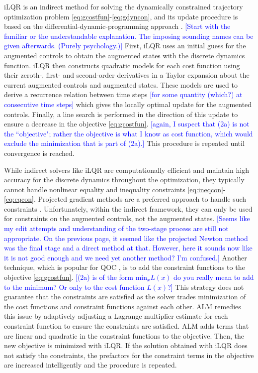 iLQR is an indirect method
for solving the dynamically constrained
trajectory optimization problem \eqref{eq:gcostfun}-\eqref{eq:gdyncon},
and its update procedure is based on the differential-dynamic-programming approach
\cite{mayne1966a}. \textcolor{blue}{[Start with the familiar or the understandable explanation. The imposing sounding names can be given afterwards. (Purely psychology.)]}
First, iLQR uses an initial guess for the augmented controls to obtain the augmented
states with the discrete dynamics function.
iLQR then constructs quadratic models for each cost function using
their zeroth-, first- and second-order derivatives in a Taylor expansion
about the current augmented controls and augmented states.
These models are used to derive a recurrence relation between time steps \textcolor{blue}{[for some quantity (which?) at consecutive time steps]}
which gives the locally optimal update for the augmented controls.
Finally, a line search \cite{zhang2006global}
is performed in the direction of this update to ensure a
decrease in the objective \eqref{eq:gcostfun}. \textcolor{blue}{[again, I suspect that (2a) is not the ``objective"; rather the objective is what I know as cost function, which would exclude the minimization that is part of (2a).]} This procedure
is repeated until convergence is reached.

While indirect solvers like iLQR are computationally efficient and maintain high accuracy for the discrete dynamics throughout the optimization, they typically cannot handle
nonlinear equality and inequality
constraints \eqref{eq:ineqcon}-\eqref{eq:eqcon}.
Projected gradient methods are a preferred approach
to handle such constraints
\cite{clarkson2010coresets, hauswirth2016projected, morzhin2019minimal,
  nikolskii2007convergence}. Unfortunately, within the indirect framework,
they can only be used for constraints on the augmented controls,
not the augmented states. \textcolor{blue}{[Seems like my edit attempts and understanding of the two-stage process are still not appropriate. On the previous page, it seemed like the projected Newton method was the final stage and a direct method at that. However, here it sounds now like it is not good enough and we need yet another method? I'm confused.]}
Another technique, which is popular for QOC \cite{heeres2017implementing, leung2017speedup,
reinhold2019controlling},
is to add the constraint functions to the objective
\eqref{eq:gcostfun}. \textcolor{blue}{[(2a) is of the form $\text{min}_x L(x)$ do you really mean to add to the minimum? Or only to the cost function $L(x)$?]}
This strategy does not guarantee that the constraints
are satisfied as the solver trades
minimization of the cost functions and constraint functions against each other.
ALM remedies this issue by adaptively adjusting a Lagrange multiplier estimate
for each constraint function to ensure the constraints are satisfied.
ALM adds terms that are linear and quadratic in the constraint functions
to the objective. Then, the new objective is minimized with
iLQR. If the solution obtained with iLQR does not satisfy the constraints,
the prefactors for the constraint terms in the objective are increased
intelligently and the procedure is repeated.


